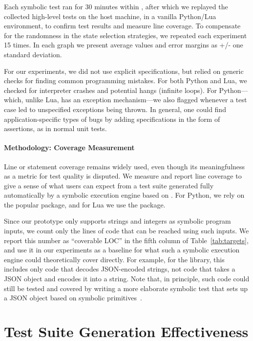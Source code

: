 Each symbolic test ran for 30 minutes within \chef, after which we replayed the collected high-level tests on the host machine, in a vanilla Python/Lua environment, to confirm test results and measure line coverage.  To compensate for the randomness in the state selection strategies, we repeated each experiment 15 times.  In each graph we present average values and error margins as +/- one standard deviation.

For our experiments, we did not use explicit specifications, but relied on generic checks for finding common programming mistakes.  For both Python and Lua, we checked for interpreter crashes and potential hangs (infinite loops). 
For Python---which, unlike Lua, has an exception mechanism---we also flagged whenever a test case led to unspecified exceptions being thrown.
%
In general, one could find application-specific types of bugs by adding specifications in the form of assertions, as in normal unit tests.

\paragraph{Methodology: Coverage Measurement}

Line or statement coverage remains widely used, even though its meaningfulness as a metric for test quality is disputed. We measure and report line coverage to give a sense of what users can expect from a test suite generated fully automatically by a symbolic execution engine based on \chef.  For Python, we rely on the popular  package, and for Lua we use the  package.

Since our prototype only supports strings and integers as symbolic program inputs, we count only the lines of code that can be reached using such inputs. We report this number as ``coverable LOC'' in the fifth column of Table~\ref{tab:targets}, and use it in our experiments as a baseline for what such a symbolic execution engine could theoretically cover directly.  For example, for the  library, this includes only code that decodes JSON-encoded strings, not code that takes a JSON object and encodes it into a string. Note that, in principle, such code could still be tested and covered by writing a more elaborate symbolic test that sets up a JSON object based on symbolic primitives~\cite{paas-testing}.


\section{Test Suite Generation Effectiveness}

